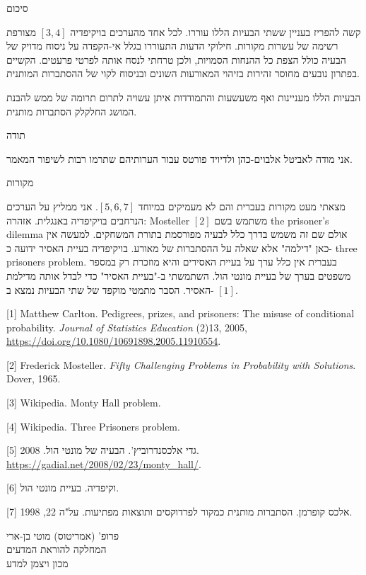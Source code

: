 \documentclass[12pt,a4paper,leqno]{article}
\renewcommand*{\L}[1]{\textenglish{#1}}
\newcommand*{\R}[1]{\texthebrew{#1}}
\begin{document}
{\bigskip\Large
סיכום}

קשה להפריז בעניין ששתי הבעיות הללו עוררו. לכל אחד מהערכים בויקיפדיה 
$[3,4]$
מצורפת רשימה של עשרות מקורות. חילוקי הדעות התעוררו בגלל אי-הקפדה על ניסוח מדויק של הבעיה כולל הצפת כל ההנחות הסמויות, ולכן טרחתי לנסח אותה לפרטי פרעטים. הקשיים בפתרון נובעים מחוסר זהירות בזיהוי המאורעות השונים ובניסוח לקוי של ההסתברות המותנית. 

הבעיות הללו מעניינות ואף משעשעות והתמודדות איתן עשויה לתרום תרומה של ממש להבנת המושג החלקלק הסתברות מותנית.

{\bigskip\Large
תודה}

אני מודה לאביטל אלבוים-כהן ולדיויד פורטס עבור הערותיהם שתרמו רבות לשיפור המאמר.

{\bigskip\Large
מקורות}

מצאתי מעט מקורות בעברית והם לא מעמיקים במיוחד 
$[5,6,7]$.
אני ממליץ על הערכים הנרחבים בויקיפדיה באנגלית. אזהרה: 
\L{Mosteller}
$[2]$
משתמש בשם
\L{the prisoner's dilemma}
אולם שם זה משמש בדרך כלל לבעיה מפורסמת בתורת המשחקים. למעשה אין כאן "דילמה" אלא שאלה על ההסתברות של מאורע. בויקיפדיה בעיית האסיר ידועה כ-%
\L{three prisoners problem}.
בעברית אין כלל ערך על בעיית האסירים והיא מוזכרת רק במספר משפטים בערך של בעיית מונטי הול. השתמשתי ב-"בעיית האסיר" כדי לבדל אותה מדילמת האסיר. הסבר מתמטי מוקפד של שתי הבעיות נמצא ב-%
$[1]$.


[1] Matthew Carlton. Pedigrees, prizes, and prisoners: The misuse of conditional probability. \textit{Journal of Statistics Education} (2)13, 2005, \url{https://doi.org/10.1080/10691898.2005.11910554}.

[2] Frederick Mosteller. \textit{Fifty Challenging Problems in Probability with Solutions}. Dover, 1965.

[3] Wikipedia. Monty Hall problem.

[4] Wikipedia. Three Prisoners problem.

[5]
\R{%
גדי אלכסנדרוביץ’. הבעיה של מונטי הול. 2008.}\\
\url{https://gadial.net/2008/02/23/monty_hall/}.

[6]
\R{וקיפדיה. בעיית מונטי הול}.

[7]
\R{%
אלכס קופרמן. הסתברות מותנית כמקור לפרדוקסים ותוצאות מפתיעות. על"ה 22, 1998.}

\bigskip

\begin{center}
פרופ' (אמריטוס) מוטי בן-ארי\\
המחלקה להוראת המדעים\\
מכון ויצמן למדע
\end{center} 
\end{document}

